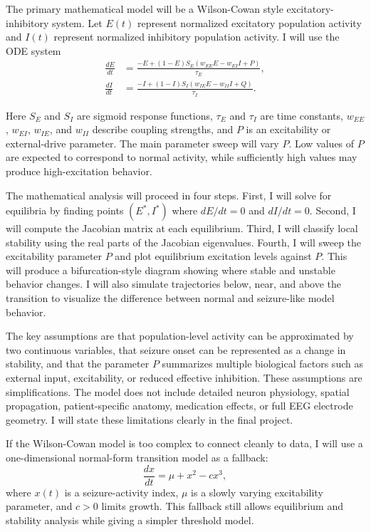 \documentclass[11pt]{article}
\begin{document}
The primary mathematical model will be a Wilson-Cowan style excitatory-inhibitory system. Let \(E(t)\) represent normalized excitatory population activity and \(I(t)\) represent normalized inhibitory population activity. I will use the ODE system
\begin{align}
\frac{dE}{dt}
&=
\frac{-E + (1-E)S_E(w_{EE}E - w_{EI}I + P)}{\tau_E}, \\
\frac{dI}{dt}
&=
\frac{-I + (1-I)S_I(w_{IE}E - w_{II}I + Q)}{\tau_I}.
\end{align}

Here \(S_E\) and \(S_I\) are sigmoid response functions, \(\tau_E\) and \(\tau_I\) are time constants, \(w_{EE}\), \(w_{EI}\), \(w_{IE}\), and \(w_{II}\) describe coupling strengths, and \(P\) is an excitability or external-drive parameter. The main parameter sweep will vary \(P\). Low values of \(P\) are expected to correspond to normal activity, while sufficiently high values may produce high-excitation behavior.

The mathematical analysis will proceed in four steps. First, I will solve for equilibria by finding points \((E^\ast, I^\ast)\) where \(dE/dt = 0\) and \(dI/dt = 0\). Second, I will compute the Jacobian matrix at each equilibrium. Third, I will classify local stability using the real parts of the Jacobian eigenvalues. Fourth, I will sweep the excitability parameter \(P\) and plot equilibrium excitation levels against \(P\). This will produce a bifurcation-style diagram showing where stable and unstable behavior changes. I will also simulate trajectories below, near, and above the transition to visualize the difference between normal and seizure-like model behavior.

The key assumptions are that population-level activity can be approximated by two continuous variables, that seizure onset can be represented as a change in stability, and that the parameter \(P\) summarizes multiple biological factors such as external input, excitability, or reduced effective inhibition. These assumptions are simplifications. The model does not include detailed neuron physiology, spatial propagation, patient-specific anatomy, medication effects, or full EEG electrode geometry. I will state these limitations clearly in the final project.

If the Wilson-Cowan model is too complex to connect cleanly to data, I will use a one-dimensional normal-form transition model as a fallback:
\begin{equation}
\frac{dx}{dt} = \mu + x^2 - cx^3,
\end{equation}
where \(x(t)\) is a seizure-activity index, \(\mu\) is a slowly varying excitability parameter, and \(c > 0\) limits growth. This fallback still allows equilibrium and stability analysis while giving a simpler threshold model.
\end{document}
